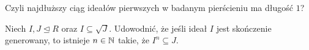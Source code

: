 \documentclass{article}
\begin{document}
Czyli najdłuższy ciąg ideałów pierwszych w badanym pierścieniu ma długość $1$?



%
%
%



%
%

\begin{problem}{2}
  Niech $I, J\trianglelefteq R$ oraz $I\subseteq \sqrt{J}$. Udowodnić, że jeśli ideał $I$ jest skończenie generowany, to istnieje $n\in\mathbb{N}$ takie, że $I^n\subseteq J$.
\end{problem}
\end{document}
